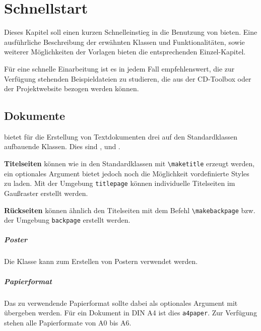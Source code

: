 \chapter{Schnellstart}\label{sec:rapid}

Dieses Kapitel soll einen kurzen Schnelleinstieg in die Benutzung von
\tubslatex bieten. Eine ausführliche Beschreibung der erwähnten
Klassen und Funktionalitäten, sowie weiterer Möglichkeiten der Vorlagen
bieten die entsprechenden Einzel-Kapitel.

Für eine schnelle Einarbeitung ist es in jedem Fall empfehlenswert, die
zur Verfügung stehenden Beispieldateien zu studieren, die aus der
CD-Toolbox oder der Projektwebsite bezogen werden können.

\section{Dokumente}
\tubslatex bietet für die Erstellung von Textdokumenten drei auf den
Standardklassen aufbauende Klassen. Dies sind ,
 und .

\textbf{Titelseiten} können wie in den Standardklassen mit \lstinline{\maketitle}
erzeugt werden, ein optionales Argument bietet jedoch noch die Möglichkeit
vordefinierte Styles zu laden.
Mit der Umgebung \lstinline{titlepage} können individuelle Titelseiten
im Gaußraster erstellt werden.

\textbf{Rückseiten} können ähnlich den Titelseiten mit dem Befehl
\lstinline{\makebackpage} bzw. der Umgebung \lstinline{backpage} erstellt werden.



\paragraph{Poster}
Die Klasse  kann zum Erstellen von Postern verwendet werden.

\paragraph{Papierformat}
Das zu verwendende Papierformat sollte dabei als optionales Argument mit
übergeben werden. Für ein Dokument in DIN A4 ist dies \texttt{a4paper}.
Zur Verfügung stehen alle Papierformate von A0 bis A6.

